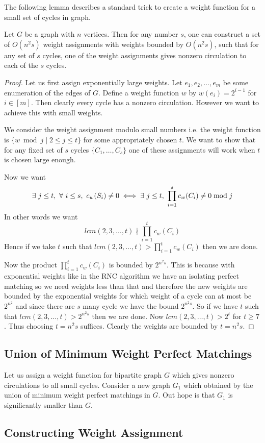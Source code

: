 The following lemma describes a standard trick to create a weight function for a small set of cycles in graph.
\begin{lemma}{\cite{ChariRohatgiSrinivasan_1993_Rou_CONF}}{}
	Let $G$ be a graph with $n$ vertices. Then for any number $s$, one can construct a set of $O(n^2s)$ weight assignments with weights bounded by $O(n^2s)$, such that for any set of $s$ cycles, one of the weight assignments gives nonzero circulation to each of the $s$ cycles.
\end{lemma}
\begin{proof}
	Let us first assign exponentially large weights. Let $e_1, e_2,\dots , e_m$ be some enumeration of the edges of $G$. Define  a weight function $w$ by $w(e_i)=2^{i-1}$ for $i\in [m]$. Then clearly every cycle has a nonzero circulation. However we want to achieve this with small weights.
	
We consider the weight assignment modulo small numbers i.e. the weight function is $\{w\bmod j\mid 2\leq j\leq t\}$ for some appropriately chosen $t$. We want to show that for any fixed set of $s$ cycles $\{C_1,\dots, C_s\}$ one of these assignments will work when $t$ is chosen large enough. 
	
	Now we want $$\exs\ j\leq t,\ \forall\ i\leq s,\ c_w(S_i)\neq 0\iff \exs\ j\leq t,\ \prod_{i=1}^s c_w(C_i)\neq 0\bmod j$$In other words we want $$lcm(2,3,\dots, t)\nmid \prod_{i=1}^t c_w(C_i)$$Hence if we take $t$ such that $lcm(2,3,\dots, t)> \prod\limits_{i=1}^t c_w(C_i)$ then we are done. 
	
	Now the product $\prod\limits_{i=1}^t c_w(C_i)$ is bounded by $2^{n^2s}$. This is because with exponential weights {like in the RNC algorithm} we have an isolating perfect matching so we need weights less than that and therefore the new weights are bounded by the exponential weights for which weight of a cycle can at most be $2^{n^2}$ and since there are $s$ many cycle we have the bound $2^{n^2s}$. So if we have $t$ such that $lcm(2,3,\dots, t)>2^{n^2s}$ then we are done. Now $lcm(2,3,\dots,t)>2^t$ for $t\geq 7$. Thus choosing $t=n^2s$ suffices. Clearly the weights are bounded by $t=n^2s$.
\end{proof}

\subsection{Union of Minimum Weight Perfect Matchings}
Let us assign a weight function for bipartite graph $G$ which gives nonzero circulations to all small cycles. Consider a new graph $G_1$ which obtained by the union of minimum weight perfect matchings in $G$. Out hope is that $G_1$ is significantly smaller than $G$.

\subsection{Constructing Weight Assignment}